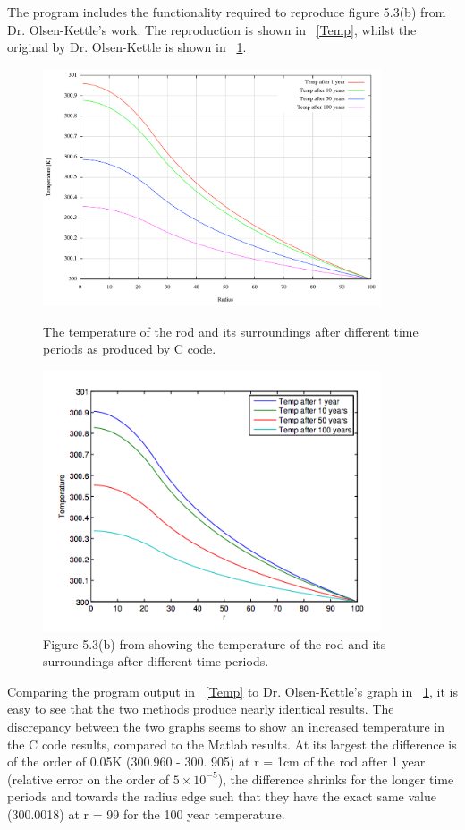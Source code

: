 \documentclass{article}
\newcommand{\figref}[2][\figurename~]{#1\ref{#2}}
\begin{document}
The program includes the functionality required to reproduce figure 5.3(b) from Dr. Olsen-Kettle's work. The reproduction is shown in \figref{Temp}, whilst the original by Dr. Olsen-Kettle is shown in \figref{DrTemp}.

\begin{figure}[htbp]
\centering
\includegraphics[width=100mm]{Temp.png}
\caption{The temperature of the rod and its surroundings after different time periods as produced by C code.}
\label{Temp}
\includegraphics[width=100mm]{DrTemp.png}
\caption{Figure 5.3(b) from \cite{Olsen-Kettle} showing the temperature of the rod and its surroundings after different time periods.}
\label{DrTemp}
\end{figure}

Comparing the program output in \figref{Temp} to Dr. Olsen-Kettle's graph in \figref{DrTemp}, it is easy to see that the two methods produce nearly identical results. The discrepancy between the two graphs seems to show an increased temperature in the C code results, compared to the Matlab results. At its largest the difference is of the order of 0.05K (300.960 - 300. 905) at r = 1cm of the rod after 1 year (relative error on the order of $5\times10^{-5}$), the difference shrinks for the longer time periods and towards the radius edge such that they have the exact same value (300.0018) at r = 99 for the 100 year temperature.
\end{document}

